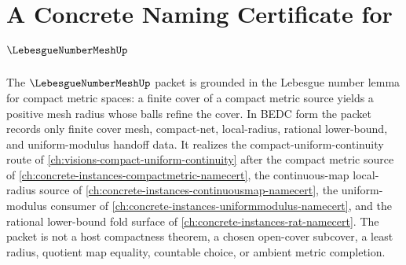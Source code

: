 \chapter{A Concrete Naming Certificate for $\LebesgueNumberMeshUp$}
\label{ch:concrete-instances-lebesgue-number-mesh-namecert}

The $\LebesgueNumberMeshUp$ packet is grounded in the Lebesgue number lemma for compact metric spaces: a finite cover of a compact metric source yields a positive mesh radius whose balls refine the cover. In BEDC form the packet records only finite cover mesh, compact-net, local-radius, rational lower-bound, and uniform-modulus handoff data. It realizes the compact-uniform-continuity route of \autoref{ch:visions-compact-uniform-continuity} after the compact metric source of \autoref{ch:concrete-instances-compactmetric-namecert}, the continuous-map local-radius source of \autoref{ch:concrete-instances-continuousmap-namecert}, the uniform-modulus consumer of \autoref{ch:concrete-instances-uniformmodulus-namecert}, and the rational lower-bound fold surface of \autoref{ch:concrete-instances-rat-namecert}. The packet is not a host compactness theorem, a chosen open-cover subcover, a least radius, quotient map equality, countable choice, or ambient metric completion.

